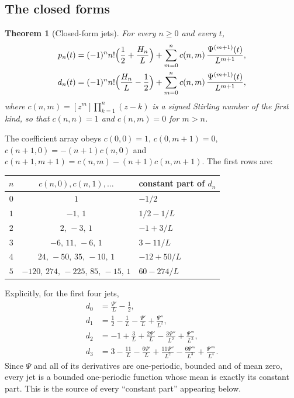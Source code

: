 \documentclass[11pt,oneside]{article}
\newtheorem{theorem}{Theorem}[section]
\theoremstyle{definition}
\theoremstyle{remark}
\begin{document}
\subsection{The closed forms}

\begin{theorem}[Closed-form jets]\label{thm:jets}
For every $n\ge0$ and every $t$,
\[
\begin{aligned}
  p_n(t)&=(-1)^nn!\Bigl(\frac12+\frac{H_n}{L}\Bigr)
    +\sum_{m=0}^{n}c(n,m)\,\frac{\Psi^{(m+1)}(t)}{L^{m+1}},\\
  d_n(t)&=(-1)^nn!\Bigl(\frac{H_n}{L}-\frac12\Bigr)
    +\sum_{m=0}^{n}c(n,m)\,\frac{\Psi^{(m+1)}(t)}{L^{m+1}},
\end{aligned}
\]
where $c(n,m)=[z^m]\prod_{k=1}^n(z-k)$ is a signed Stirling number of the first
kind, so that $c(n,n)=1$ and $c(n,m)=0$ for $m>n$.
\end{theorem}

The coefficient array obeys $c(0,0)=1$, $c(0,m+1)=0$,
$c(n+1,0)=-(n+1)c(n,0)$ and $c(n+1,m+1)=c(n,m)-(n+1)c(n,m+1)$.  The first rows
are:

\begin{center}
\begin{tabular}{@{}ccl@{}}
\toprule
$n$ & $c(n,0),c(n,1),\dots$ & constant part of $d_n$\\
\midrule
$0$ & $1$ & $-1/2$\\
$1$ & $-1,\,1$ & $1/2-1/L$\\
$2$ & $2,\,-3,\,1$ & $-1+3/L$\\
$3$ & $-6,\,11,\,-6,\,1$ & $3-11/L$\\
$4$ & $24,\,-50,\,35,\,-10,\,1$ & $-12+50/L$\\
$5$ & $-120,\,274,\,-225,\,85,\,-15,\,1$ & $60-274/L$\\
\bottomrule
\end{tabular}
\end{center}

Explicitly, for the first four jets,
\[
\begin{aligned}
  d_0&=\frac{\Psi'}{L}-\frac12,\\
  d_1&=\frac12-\frac1L-\frac{\Psi'}{L}+\frac{\Psi''}{L^2},\\
  d_2&=-1+\frac3L+\frac{2\Psi'}{L}-\frac{3\Psi''}{L^2}+\frac{\Psi'''}{L^3},\\
  d_3&=3-\frac{11}{L}-\frac{6\Psi'}{L}+\frac{11\Psi''}{L^2}
        -\frac{6\Psi'''}{L^3}+\frac{\Psi''''}{L^4}.
\end{aligned}
\]
Since $\Psi$ and all of its derivatives are one-periodic, bounded and of mean
zero, every jet is a bounded one-periodic function whose mean is exactly its
constant part.  This is the source of every ``constant part'' appearing below.
\end{document}
